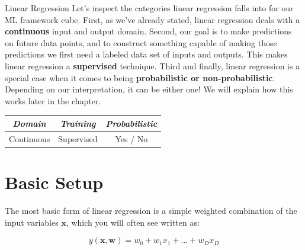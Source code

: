\begin{mlcube}{Linear Regression}
Let's inspect the categories linear regression falls into for our ML framework cube. First, as we've already stated, linear regression deals with a \textbf{continuous} input and output domain. Second, our goal is to make predictions on future data points, and to construct something capable of making those predictions we first need a labeled data set of inputs and outputs. This makes linear regression a \textbf{supervised} technique. Third and finally, linear regression is a special case when it comes to being \textbf{probabilistic or non-probabilistic}. Depending on our interpretation, it can be either one! We will explain how this works later in the chapter.
\begin{center}
    \begin{tabular}{c|c|c}
    \textit{\textbf{Domain}} & \textit{\textbf{Training}} & \textit{\textbf{Probabilistic}} \\
    \hline
    Continuous & Supervised & Yes / No \\
    \end{tabular}
\end{center}
\end{mlcube}

\section{Basic Setup}
The most basic form of linear regression is a simple weighted combination of the input variables $\textbf{x}$, which you will often see written as:

\begin{equation}
    y(\textbf{x}, \textbf{w}) = w_{0} + w_{1}x_{1} + ... + w_{D}x_{D}
\end{equation}


